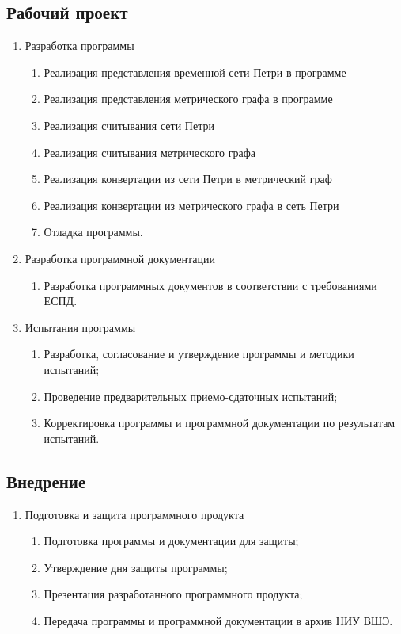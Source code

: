 \documentclass{../TechDoc}
\begin{document}
	\subsection{Рабочий проект}
	\begin{enumerate}
		\item Разработка программы
		\begin{enumerate}
			\item Реализация представления временной сети Петри в программе
			\item Реализация представления метрического графа в программе
			\item Реализация считывания сети Петри
			\item Реализация считывания метрического графа
			\item Реализация конвертации из сети Петри в метрический граф
			\item Реализация конвертации из метрического графа в сеть Петри
			\item Отладка программы.
		\end{enumerate}
		
		\item Разработка программной документации
		\begin{enumerate}
			\item Разработка программных документов в соответствии с требованиями ЕСПД.
		\end{enumerate}
		
		\item Испытания программы
		\begin{enumerate}
			\item Разработка, согласование и утверждение программы и методики испытаний;
			\item Проведение предварительных приемо-сдаточных испытаний;
			\item Корректировка программы и программной документации по результатам испытаний. 
		\end{enumerate}
	\end{enumerate}
	\subsection{Внедрение}
	\begin{enumerate}
		\item Подготовка и защита программного продукта
		\begin{enumerate}
			\item Подготовка программы и документации для защиты;
			\item Утверждение дня защиты программы;
			\item Презентация разработанного программного продукта;
			\item Передача программы и программной документации в архив НИУ ВШЭ.
		\end{enumerate}
	\end{enumerate} 
\end{document}

